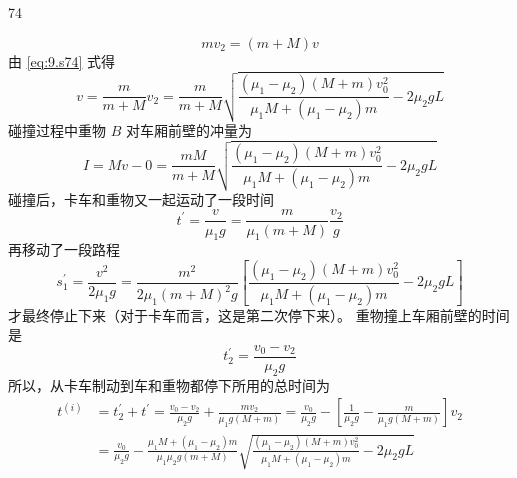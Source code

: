 \begin{solution}{74}
\begin{subsolution}
\begin{subsubsolution}
            \begin{equation}
                m v_{2} = (m + M) v
                \label{eq:9.s74}
            \end{equation}
            由 \eqref{eq:9.s74} 式得
            \begin{equation}
                v = \frac{m}{m + M} v_{2} = \frac{m}{m + M} \sqrt{\frac{(\mu_{1} - \mu_{2})(M + m) v_{0}^{2}}{\mu_{1} M + (\mu_{1} - \mu_{2}) m} - 2 \mu_{2} g L}
            \end{equation}
            碰撞过程中重物 $B$ 对车厢前壁的冲量为
            \begin{equation}
                I = M v - 0 = \frac{m M}{m + M} \sqrt{\frac{(\mu_{1} - \mu_{2})(M + m) v_{0}^{2}}{\mu_{1} M + (\mu_{1} - \mu_{2}) m} - 2 \mu_{2} g L}
                \label{eq:10.s74}
            \end{equation}
            碰撞后，卡车和重物又一起运动了一段时间
            \begin{equation}
                t^{\prime} = \frac{v}{\mu_{1} g} = \frac{m}{\mu_{1} (m + M)} \frac{v_{2}}{g}
                \label{eq:11.s74}
            \end{equation}
            再移动了一段路程
            \begin{equation}
                s_{1}^{\prime} = \frac{v^{2}}{2 \mu_{1} g} = \frac{m^{2}}{2 \mu_{1} (m + M)^{2} g} \left[ \frac{(\mu_{1} - \mu_{2})(M + m) v_{0}^{2}}{\mu_{1} M + (\mu_{1} - \mu_{2}) m} - 2 \mu_{2} g L \right]
                \label{eq:12.s74}
            \end{equation}
            才最终停止下来（对于卡车而言，这是第二次停下来）。
            重物撞上车厢前壁的时间是
            \begin{equation}
                t_{2}^{\prime} = \frac{v_{0} - v_{2}}{\mu_{2} g}
                \label{eq:13.s74}
            \end{equation}
            所以，从卡车制动到车和重物都停下所用的总时间为
            \begin{align}
                t^{(i)} &= t_{2}^{\prime} + t^{\prime} = \frac{v_{0} - v_{2}}{\mu_{2} g} + \frac{m v_{2}}{\mu_{1} g (M + m)} = \frac{v_{0}}{\mu_{2} g} - \left[ \frac{1}{\mu_{2} g} - \frac{m}{\mu_{1} g (M + m)} \right] v_{2} \nonumber \\
                &= \frac{v_{0}}{\mu_{2} g} - \frac{\mu_{1} M + (\mu_{1} - \mu_{2}) m}{\mu_{1} \mu_{2} g (m + M)} \sqrt{\frac{(\mu_{1} - \mu_{2})(M + m) v_{0}^{2}}{\mu_{1} M + (\mu_{1} - \mu_{2}) m} - 2 \mu_{2} g L}
                \label{eq:14.s74}

\end{align}
\end{subsubsolution}
\end{subsolution}
\end{solution}

